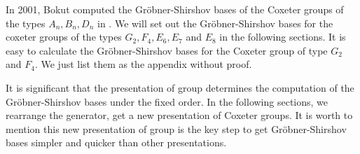 \documentclass[UTF8]{amsart}
\theoremstyle{definition}
\theoremstyle{remark}
\numberwithin{equation}{section}
\begin{document}
In 2001, Bokut computed the Gr\"{o}bner-Shirshov bases of the Coxeter groups of the types $A_n,B_n,D_n$ in \cite{MR1857281}. We will set out the Gr\"{o}bner-Shirshov bases for the coxeter groups of the types $G_2,F_4,E_6,E_7$ and $E_8$ in the following sections.  It is easy to calculate the Gr\"{o}bner-Shirshov bases for the Coxeter group of type $G_2$ and $F_4$. We just list them as the  appendix without proof. \par
It is significant that  the presentation of group determines the computation of the Gr\"{o}bner-Shirshov bases under the fixed order.  In the following sections, we rearrange the generator, get a new presentation of Coxeter groups. It is worth to mention this  new presentation of group is the key step to get Gr\"{o}bner-Shirshov bases simpler and quicker than other presentations. \par
\end{document}
